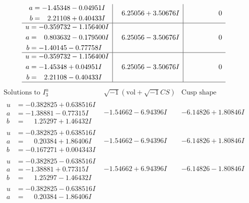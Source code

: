 \documentclass[1p]{elsarticle_modified}
\theoremstyle{definition}
\newcommand{\I}{\sqrt{-1}}
\begin{document}
$$\begin{array}{c|c|c}
\begin{aligned}
a &= -1.45348 - 0.04951 I \\
b &= \phantom{-}2.21108 + 0.40433 I\end{aligned}
 & \phantom{-}6.25056 + 3.50676 I & \phantom{-0.000000 } 0 \\ \hline\begin{aligned}
u &= -0.359732 - 1.156400 I \\
a &= \phantom{-}0.803632 - 0.179500 I \\
b &= -1.40145 - 0.77758 I\end{aligned}
 & \phantom{-}6.25056 - 3.50676 I & \phantom{-0.000000 } 0 \\ \hline\begin{aligned}
u &= -0.359732 - 1.156400 I \\
a &= -1.45348 + 0.04951 I \\
b &= \phantom{-}2.21108 - 0.40433 I\end{aligned}
 & \phantom{-}6.25056 - 3.50676 I & \phantom{-0.000000 } 0\\
 \hline 
 \end{array}$$\newpage$$\begin{array}{c|c|c}  
\text{Solutions to }I^u_{3}& \I (\text{vol} + \sqrt{-1}CS) & \text{Cusp shape}\\
 \hline 
\begin{aligned}
u &= -0.382825 + 0.638516 I \\
a &= -1.38881 - 0.77315 I \\
b &= \phantom{-}1.25297 + 1.46432 I\end{aligned}
 & -1.54662 - 6.94396 I & -6.14826 + 1.80846 I \\ \hline\begin{aligned}
u &= -0.382825 + 0.638516 I \\
a &= \phantom{-}0.20384 + 1.86406 I \\
b &= -0.167271 + 0.004343 I\end{aligned}
 & -1.54662 - 6.94396 I & -6.14826 + 1.80846 I \\ \hline\begin{aligned}
u &= -0.382825 - 0.638516 I \\
a &= -1.38881 + 0.77315 I \\
b &= \phantom{-}1.25297 - 1.46432 I\end{aligned}
 & -1.54662 + 6.94396 I & -6.14826 - 1.80846 I \\ \hline\begin{aligned}
u &= -0.382825 - 0.638516 I \\
a &= \phantom{-}0.20384 - 1.86406 I \\

\end{aligned}
\end{array}$$
\end{document}

